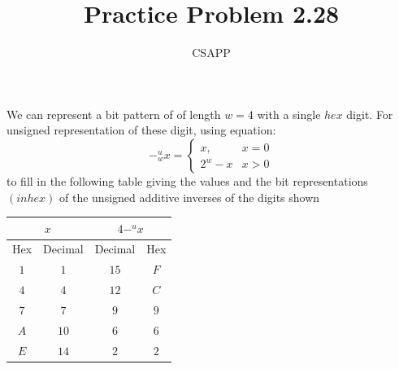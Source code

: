 \documentclass{article}
\title{Practice Problem 2.28}
\author{CSAPP}
\begin{document}
    \maketitle
    \begin{flushleft}
        We can represent a bit pattern of of length $w = 4$
        with a single $hex$ digit. For unsigned representation of these
        digit, using equation: \\

        \[
         -^u_w x = \begin{cases}
         x,       & x = 0\\
         2^w - x  & x > 0 
        \end{cases}
        \]
        to fill in the following table giving the values and the bit representations
        $(in hex)$ of the unsigned additive inverses of the digits shown
        \\

        \begin{tabular}{cc|cc}
        \toprule
        \multicolumn{2}{c|}{$x$} & \multicolumn{2}{c}{$4 -^u x$} \\
        \midrule
        Hex & Decimal & Decimal & Hex \\
        \midrule
        $1$ & $1$  & $15$ & $F$\\
        $4$ & $4$  & $12$ & $C$\\
        $7$ & $7$  & $9$  & $9$\\
        $A$ & $10$ & $6$  & $6$\\
        $E$ & $14$ & $2$  & $2$\\
        \bottomrule
        \end{tabular}
    \end{flushleft}
\end{document}
